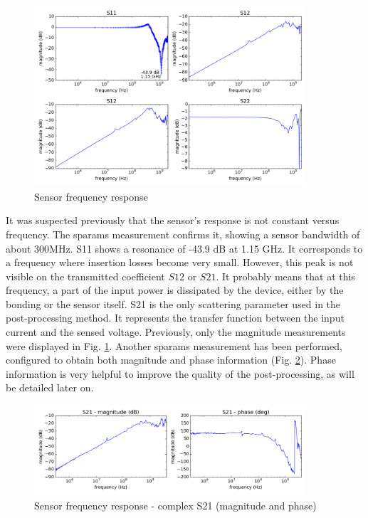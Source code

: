 \begin{figure}[!h]
  \centering
  \includegraphics[width=0.9\textwidth]{src/3/figures/sensor_freq_response.png}
  \caption{Sensor frequency response}
  \label{fig:sensor-response}
\end{figure}

It was suspected previously that the sensor's response is not constant versus frequency.
The \gls{sparams} measurement confirms it, showing a sensor bandwidth of about 300MHz.
S11 shows a resonance of -43.9 dB at 1.15 GHz.
It corresponds to a frequency where insertion losses become very small.
However, this peak is not visible on the transmitted coefficient $S12$ or $S21$.
It probably means that at this frequency, a part of the input power is dissipated by the device, either by the bonding or the sensor itself.
S21 is the only scattering parameter used in the post-processing method.
It represents the transfer function between the input current and the sensed voltage.
Previously, only the magnitude measurements were displayed in Fig. \ref{fig:sensor-response}.
Another \gls{sparams} measurement has been performed, configured to obtain both magnitude and phase information (Fig. \ref{fig:s21-response-complex}).
Phase information is very helpful to improve the quality of the post-processing, as will be detailed later on.

\begin{figure}[!h]
  \centering
  \includegraphics[width=0.9\textwidth]{src/3/figures/s21_freq_response.png}
  \caption{Sensor frequency response - complex S21 (magnitude and phase)}
  \label{fig:s21-response-complex}
\end{figure}

